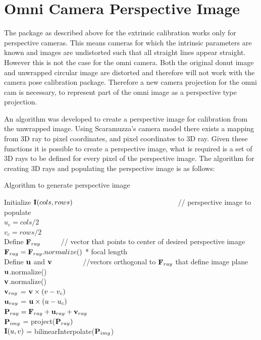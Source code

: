 \section{Omni Camera Perspective Image}
\label{sec:perspective_from_donut}

The package as described above for the extrinsic calibration works only for perspective cameras. This means cameras for which the intrinsic parameters are known and images are undistorted such that all straight lines appear straight.  However this is not the case for the omni camera.  Both the original donut image and unwrapped circular image are distorted and therefore will not work with the camera pose calibration package.  Therefore a new camera projection for the omni cam is necessary, to represent part of the omni image as a perspective type projection.

An algorithm was developed to create a perspective image for calibration from the unwrapped image.  Using Scaramuzza's camera model\cite{scaramuzza_06} there exists a  mapping from 3D ray to pixel coordinates, and pixel coordinates to 3D ray.  Given these functions it is possible to create a perspective image, what is required is a set of 3D rays to be defined for every pixel of the perspective image.  The algorithm for creating 3D rays and populating the perspective image is as follows:

\begin{algorithm}[h!]
 \caption{Algorithm to generate perspective image}
 Initialize $\mathbf I(cols,rows)$ \ \ \ \ \ \ \ \ \ \ \ \ \ \ \ \ \ \ \ \ \ \ \ \ \ \ \ \ \ 
 // perspective image to populate \\
 $u_c = cols/2$  \\
 $v_c = rows/2$  \\
 Define $\mathbf F_{ray}$ \ \ \ \ \ 
 // vector that points to center of desired perspective image \\
 $\mathbf F_{ray} = \mathbf F_{ray}.normalize()$ * focal length \ \ \ \ \ \ \ \ \ \ \ \ \ \ \ \ \\
 Define $\mathbf u$ and $\mathbf v$ \ \ \ \ \ \ \ \ 
 //vectors orthogonal to $\mathbf F_{ray}$ that define image plane \\
 $\mathbf u$.normalize() \\
 $\mathbf v$.normalize() \\
 \For{v = 0 to rows}
 {
   $\mathbf v_{ray}$ = $\mathbf v \times (v - v_c)$ \\
   {
     $\mathbf u_{ray}$ = $\mathbf u \times (u - u_c)$ \\
     $\mathbf P_{ray} = \mathbf F_{ray} + \mathbf u_{ray} + \mathbf v_{ray}$ \\
     $\mathbf P_{img}$ = project($\mathbf P_{ray})$ \\
     $\mathbf I(u,v)$ = bilinearInterpolate($\mathbf P_{img}$)
   }
 }
\end{algorithm}


